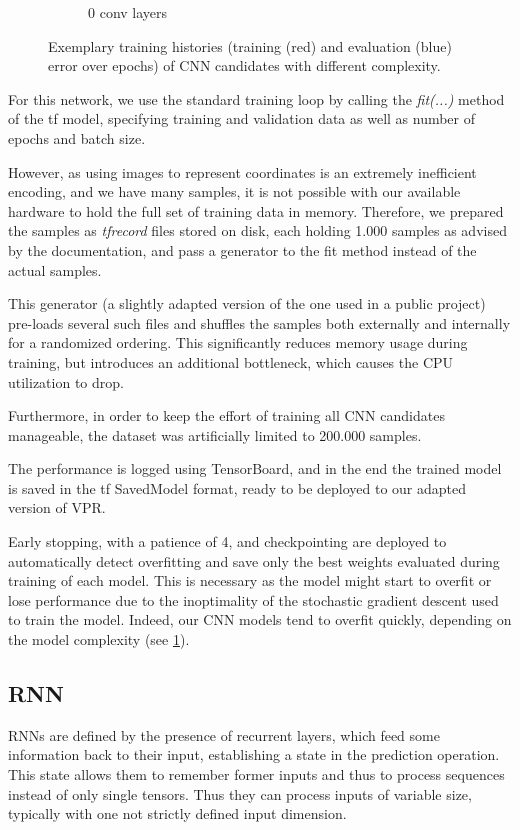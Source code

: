 \begin{figure}
\begin{subfigure}[b]{0.3\linewidth}
		\caption{0 conv layers}
	\end{subfigure}
	\caption{Exemplary training histories (training (red) and evaluation (blue) error over epochs) of \gls{CNN} candidates with different complexity.}
	\label{fig:cnn-train}
\end{figure}

For this network, we use the standard training loop by calling the \textit{fit(...)} method of the \gls{tf} model, specifying training and validation data as well as number of epochs and batch size.

However, as using images to represent coordinates is an extremely inefficient encoding, and we have many samples, it is not possible with our available hardware to hold the full set of training data in memory. Therefore, we prepared the samples as \textit{tfrecord} files stored on disk, each holding 1.000 samples as advised by the documentation\cite{TODO}, and pass a generator to the fit method instead of the actual samples.

This generator (a slightly adapted version of the one used in a public project\cite{TODO}) pre-loads several such files and shuffles the samples both externally and internally for a randomized ordering. This significantly reduces memory usage during training, but introduces an additional bottleneck, which causes the CPU utilization to drop.

Furthermore, in order to keep the effort of training all \gls{CNN} candidates manageable, the dataset was artificially limited to 200.000 samples.

The performance is logged using TensorBoard\cite{TODO}, and in the end the trained model is saved in the \gls{tf} SavedModel format\cite{TODO}, ready to be deployed to our adapted version of \gls{VPR}.

Early stopping, with a patience of 4, and checkpointing are deployed to automatically detect overfitting and save only the best weights evaluated during training of each model. This is necessary as the model might start to overfit or lose performance due to the inoptimality of the stochastic gradient descent used to train the model. Indeed, our \gls{CNN} models tend to overfit quickly, depending on the model complexity (see \ref{fig:cnn-train}). 

\subsection{\gls{RNN}}

\glspl{RNN} are defined by the presence of recurrent layers, which feed some information back to their input, establishing a state in the prediction operation. This state allows them to remember former inputs and thus to process sequences instead of only single tensors. Thus they can process inputs of variable size, typically with one not strictly defined input dimension.

